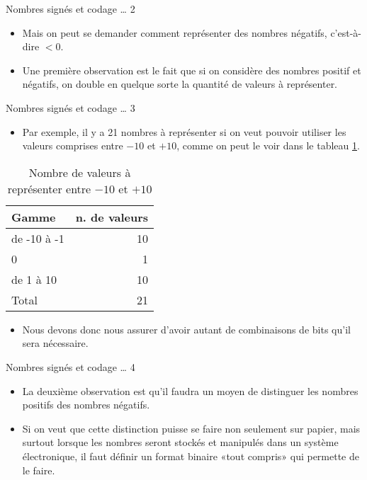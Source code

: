 \documentclass[presentation]{beamer}
\begin{document}
\begin{frame}[label={sec:org662cfac}]{Nombres signés et codage \ldots{} 2}
\begin{itemize}
\item Mais on peut se demander comment représenter des nombres négatifs, c'est-à-dire \(< 0\).

\item Une première observation est le fait que si on considère des nombres positif \alert{et} négatifs, on double en quelque sorte la quantité de valeurs à représenter.
\end{itemize}
\end{frame}

\begin{frame}[label={sec:orgd261cf0}]{Nombres signés et codage \ldots{} 3}
\begin{itemize}
\item Par exemple, il y a 21 nombres à représenter si on veut pouvoir utiliser les valeurs comprises entre \(-10\) et \(+10\), comme on peut le voir dans le tableau \ref{tab:org03c9165}.
\end{itemize}

\begin{table}[htbp]
\caption{\label{tab:org03c9165}Nombre de valeurs à représenter entre \(-10\) et \(+10\)}
\centering
\begin{tabular}{lr}
Gamme & n. de valeurs\\
\hline
de -10 à -1 & 10\\
0 & 1\\
de 1 à 10 & 10\\
\hline
Total & 21\\
\end{tabular}
\end{table}

\begin{itemize}
\item Nous devons donc nous assurer d'avoir autant de combinaisons de bits qu'il sera nécessaire.
\end{itemize}
\end{frame}

\begin{frame}[label={sec:orga77e9d5}]{Nombres signés et codage \ldots{} 4}
\begin{itemize}
\item La deuxième observation est qu'il faudra un moyen de distinguer les nombres positifs des nombres négatifs.

\item Si on veut que cette distinction puisse se faire non seulement sur papier, mais surtout lorsque les nombres seront stockés et manipulés dans un système électronique, il faut définir un format binaire «tout compris» qui permette de le faire.
\end{itemize}
\end{frame}
\end{document}
